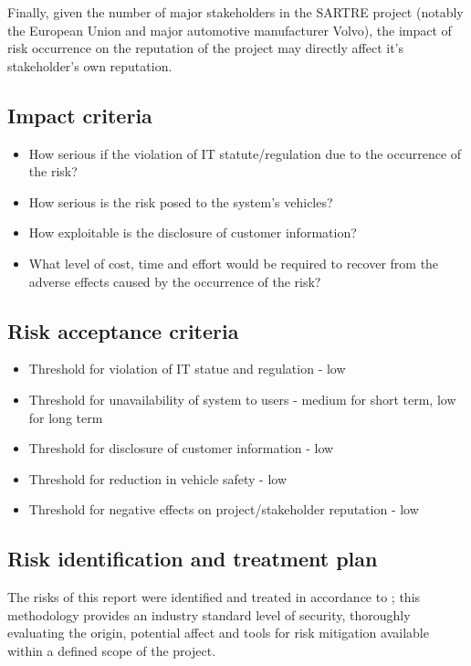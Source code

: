 \documentclass[british,11pt,a4paper]{article}
\begin{document}
Finally, given the number of major stakeholders in the SARTRE project (notably the European Union and major automotive manufacturer Volvo), the impact of risk occurrence on the reputation of the project may directly affect it's stakeholder's own reputation.

\subsection{Impact criteria}
\begin{itemize}
	\setlength\itemsep{-0.3em}
	\item How serious if the violation of IT statute/regulation due to the occurrence of the risk?
	\item How serious is the risk posed to the system's vehicles?
	\item How exploitable is the disclosure of customer information?
	\item What level of cost, time and effort would be required to recover from the adverse effects caused by the occurrence of the risk?
\end{itemize}

\subsection{Risk acceptance criteria}
\begin{itemize}
	\setlength\itemsep{-0.3em}
	\item Threshold for violation of IT statue and regulation - low
	\item Threshold for unavailability of system to users - medium for short term, low for long term
	\item Threshold for disclosure of customer information - low
	\item Threshold for reduction in vehicle safety - low
	\item Threshold for negative effects on project/stakeholder reputation - low
\end{itemize}

\clearpage
\subsection{Risk identification and treatment plan}
The risks of this report were identified and treated in accordance to \citet{ISO_27005}; this methodology provides an industry standard level of security, thoroughly evaluating the origin, potential affect and tools for risk mitigation available within a defined scope of the project.
\end{document}
